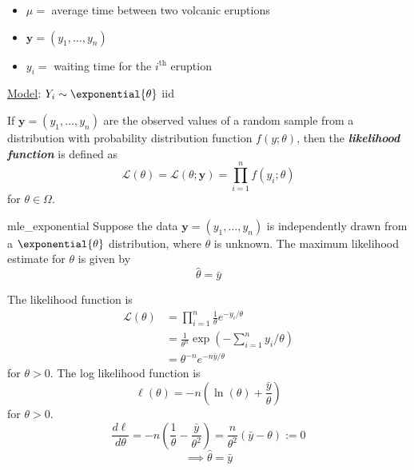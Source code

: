 \begin{Example}{}{}
    \begin{itemize}
        \item $ \mu= $ average time between two volcanic eruptions
        \item $ \symbf{y}=(y_1,\ldots ,y_n) $
        \item $ y_i= $ waiting time for the $ i^{\text{th}} $ eruption
    \end{itemize}
    \underline{Model}: $ Y_i \sim \exponential{\theta} $ iid
\end{Example}



\begin{Definition}{}{}
    If $ \symbf{y}=(y_1,\ldots ,y_n) $ are the observed values of a random sample from a distribution with
    probability distribution function $ f(y;\theta) $, then the \textbf{\emph{likelihood function}}
    is defined as
    \[ \mathcal{L}(\theta)=\mathcal{L}(\theta;\symbf{y})=\prod_{i=1}^n f(y_i;\theta) \]
    for $ \theta\in\Omega $.
\end{Definition}



\begin{Proposition}{}{mle_exponential}
    Suppose the data $ \symbf{y}=(y_1,\ldots ,y_n) $ is independently
    drawn from a $ \exponential{\theta} $ distribution, where $ \theta $ is unknown.
    The maximum likelihood estimate for $ \theta $ is given by
    \[ \hat{\theta}=\bar{y} \]
\end{Proposition}

\begin{Proof}{}{}
    The likelihood function is
    \begin{align*}
        \mathcal{L}(\theta)
         & =\prod_{i=1}^n \frac{1}{\theta} e^{-y_i/\theta}                        \\
         & =\frac{1}{\theta^n} \exp\left(-\sum\limits_{i=1}^{n} y_i/\theta\right) \\
         & =\theta^{-n}e^{-n\bar{y}/\theta}
    \end{align*}
    for $ \theta>0 $. The log likelihood function is
    \[ \ell(\theta)=-n\left( \ln(\theta)+\frac{\bar{y}}{\theta} \right) \]
    for $ \theta>0 $.
    \[ \frac{d\ell}{d\theta} =-n\left( \frac{1}{\theta} -\frac{\bar{y}}{\theta^2} \right)=
        \frac{n}{\theta^2} \left( \bar{y}-\theta \right):=0 \]
    \[ \implies \hat{\theta}=\bar{y} \]
\end{Proof}


